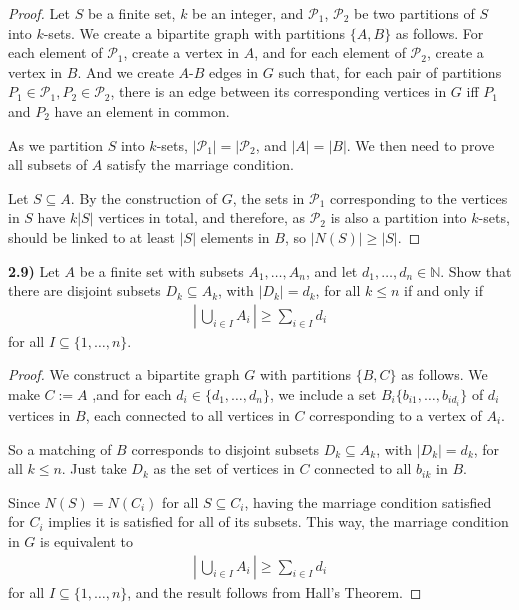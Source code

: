 \documentclass[11pt]{article}
\theoremstyle{plain}
\begin{document}
\begin{proof}
Let $S$ be a finite set, $k$ be an integer, and $\mathcal{P}_1$, $\mathcal{P}_2$ be two partitions of $S$ into $k$-sets. We create a bipartite graph with partitions $\{A,B\}$ as follows. For each element of $\mathcal{P}_1$, create a vertex in $A$, and for each element of $\mathcal{P}_2$, create a vertex in $B$. And we create $A$-$B$ edges in $G$ such that, for each pair of partitions $P_1 \in \mathcal{P}_1,P_2 \in \mathcal{P}_2$, there is an edge between its corresponding vertices in $G$ iff $P_1$ and $P_2$ have an element in common. 

As we partition $S$ into $k$-sets, $|\mathcal{P}_1| = |\mathcal{P}_2$, and $|A| = |B|$. We then need to prove all subsets of $A$ satisfy the marriage condition.

Let $S \subseteq A$. By the construction of $G$, the sets in $\mathcal{P}_1$ corresponding to the vertices in $S$ have $k|S|$ vertices in total, and therefore, as $\mathcal{P}_2$ is also a partition into $k$-sets, should be linked to at least $|S|$ elements in $B$, so $|N(S)| \geq |S|$.
\end{proof}


\textbf{2.9)} Let $A$ be a finite set with subsets $A_1,\ldots,A_n$, and let $d_1,\ldots,d_n \in \mathbb{N}$. Show that there are disjoint subsets $D_k \subseteq A_k$, with $|D_k|=d_k$, for all $k \leq n$ if and only if 
\begin{align*}
\left|\,\bigcup \limits_{i \in I} A_i\,\right| \geq \sum \limits_{i \in I} d_i
\end{align*}
for all $I \subseteq \{1,\ldots,n\}$.

\begin{proof}
We construct a bipartite graph $G$ with partitions $\{B,C\}$ as follows. We make $C:=A$ ,and for each $d_i \in \{d_1,\ldots,d_n\}$, we include a set $B_i\{b_{i1},\ldots,b_{id_i}\}$ of $d_i$ vertices in $B$, each connected to all vertices in $C$ corresponding to a vertex of $A_i$.

So a matching of $B$ corresponds to disjoint subsets $D_k \subseteq A_k$, with $|D_k|=d_k$, for all $k \leq n$. Just take $D_k$ as the set of vertices in $C$ connected to all $b_{ik}$ in $B$.

Since $N(S) = N(C_i)$ for all $S\subseteq C_i$, having the marriage condition satisfied for $C_i$ implies it is satisfied for all of its subsets. This way, the marriage condition in $G$ is equivalent to
\begin{align*}
\left|\,\bigcup \limits_{i \in I} A_i\,\right| \geq \sum \limits_{i \in I} d_i
\end{align*}
for all $I \subseteq \{1,\ldots,n\}$, and the result follows from Hall's Theorem.
\end{proof}
\end{document}
